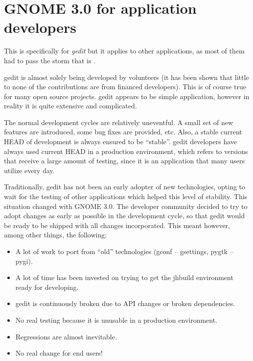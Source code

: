 
\chapter[GNOME 3.0 for application developers]{GNOME 3.0 for application developers\cite{website:gnome-3-0-for-application-developers}}\label{GNOME3AppDevs}

This is specifically for \emph{gedit} but it applies to other \GNOME applications, as most of them had to pass the storm that is .

gedit is almost solely being developed by volunteers (it has been shown that little to none of the contributions are from financed developers). This is of course true for many open source projects. gedit appears to be  simple application, however in reality it is quite extensive and complicated.

The normal development cycles are relatively uneventful. A small set of new features are introduced, some bug fixes are provided, etc. Also, 
a stable current HEAD of development is always ensured to be ``stable''.
gedit developers have always used current HEAD in a production environment, which refers to versions that receive a large amount of testing, 
since it is an application that many users utilize every day. 



Traditionally, gedit has not been an early adopter of new technologies, opting 
to wait for the testing of other applications which helped this level of stability.
This situation changed with GNOME 3.0.  The developer community decided to try to adopt changes as early as possible in the development cycle, 
so that gedit would be ready to be shipped with all changes incorporated. This meant however, among other things, the following:
\begin{itemize}
  \item A lot of work to port from ``old'' technologies (gconf – gsettings, pygtk – pygi).
  \item A lot of time has been invested on trying to get the jhbuild environment ready for developing.
  \item gedit is continuously broken due to API changes or broken dependencies.
  \item No real testing because it is unusable in a production environment.
  \item Regressions are almost inevitable.
  \item No real change for end users!
\end{itemize}

